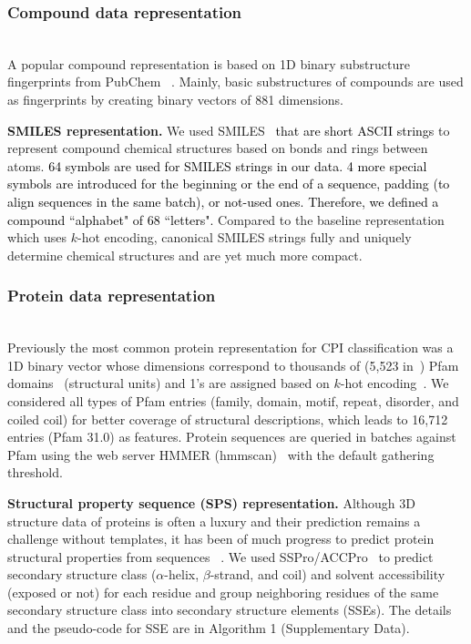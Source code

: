 \documentclass[nocrop]{bioinfo}
\newcommand{\red}[1]{\textcolor{black}{#1}}
\begin{document}
\vspace{-1em}
\subsubsection{Compound data representation}
\vspace{-1em}
\hfill\\ A popular compound representation is based on 1D binary substructure fingerprints from PubChem ~\citep{wang2009pubchem}. Mainly, basic substructures of compounds are used as fingerprints by creating binary vectors of 881 dimensions. 

{\bf SMILES representation.} We used SMILES~\citep{weininger1988smiles} \red{that are short ASCII strings} to represent compound chemical structures based on bonds and rings between atoms. \red{64 symbols are used for SMILES strings in our data.  4 more special symbols are introduced for the beginning or the end of a sequence, padding  (to align sequences in the same batch), or not-used ones. Therefore, we defined a compound ``alphabet" of 68 ``letters".} 
Compared to the baseline representation which uses $k$-hot encoding, canonical SMILES strings fully and uniquely determine chemical structures and are yet much more compact.   

\vspace{-1em}
\subsubsection{Protein data representation}
\vspace{-1em}

\hfill\\ Previously the most common protein representation for CPI classification was a 1D binary vector whose dimensions correspond to thousands of  (5,523 in~\citep{tian2016boosting}) Pfam domains~\citep{Pfam2014}  (structural units) and 1's are assigned based on $k$-hot encoding~\citep{tabei2013scalable,cheng2016effectively}.  We considered all  types of Pfam entries  (family, domain, motif, repeat, disorder, and coiled coil) for better coverage of structural descriptions, which leads to 16,712 entries  (Pfam 31.0) as features.  
Protein sequences are queried in batches against Pfam using the web server HMMER  (hmmscan)~\citep{finn2015hmmer} with the default gathering threshold.   

{\bf Structural property sequence  (SPS) representation.}  Although 3D structure data of proteins is often a luxury and their prediction remains a challenge without templates, it has been of much progress to predict protein structural properties from  sequences
~\citep{cheng2005scratch,magnan2014sspro,RaptorX-Property}.
We used SSPro/ACCPro~\citep{magnan2014sspro} to predict secondary structure class  ($\alpha$-helix, $\beta$-strand, and coil) and solvent accessibility  (exposed or not) for each residue and group neighboring residues of the same secondary structure class into secondary structure elements  (SSEs).  
The details and the pseudo-code for SSE are in Algorithm 1 (Supplementary Data).
\end{document}
